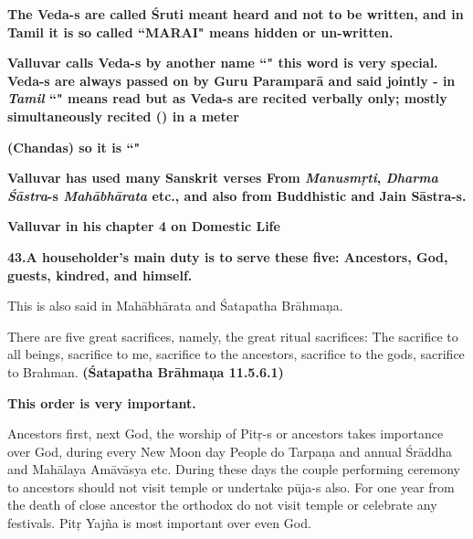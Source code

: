 \vskip 2pt

\textbf{The Veda-s are called Śruti meant heard and not to be written, and in Tamil it is so called “MARAI" means hidden or un-written.}

\vskip 2pt

\textbf{Valluvar calls Veda-s by another name “" this word is very special. Veda-s are always passed on by Guru Paramparā and said jointly - in \textit{Tamil} “" means read but as Veda-s are recited verbally only; mostly simultaneously recited () in a meter}

\vskip 2pt

\textbf{(Chandas) so it is “"}

\vskip 2pt

\textbf{Valluvar has used many Sanskrit verses From \textit{Manusmŗti}, \textit{Dharma Śāstra}-s \textit{Mahābhārata} etc., and also from Buddhistic and Jain Sāstra-s.}

\vskip 2pt

\textbf{Valluvar in his chapter 4 on Domestic Life}

\vskip 2pt

\textbf{43.A householder's main duty is to serve these five: Ancestors, God, guests, kindred, and himself.}

\vskip 2pt

This is also said in Mahābhārata and Śatapatha Brāhmaņa.

\vskip 2pt

There are five great sacrifices, namely, the great ritual sacrifices: The sacrifice to all beings, sacrifice to me, sacrifice to the ancestors, sacrifice to the gods, sacrifice to Brahman. \textbf{(Śatapatha Brāhmaņa 11.5.6.1)}

\vskip 2pt

\textbf{This order is very important.}

\vskip 2pt

Ancestors first, next God, the worship of Pitŗ-s or ancestors takes importance over God, during every New Moon day People do Tarpaņa and annual Śrāddha and Mahālaya Amāvāsya etc. During these days the couple performing ceremony to ancestors should not visit temple or undertake pūja-s also. For one year from the death of close ancestor the orthodox do not visit temple or celebrate any festivals. Pitŗ Yajña is most important over even God.


